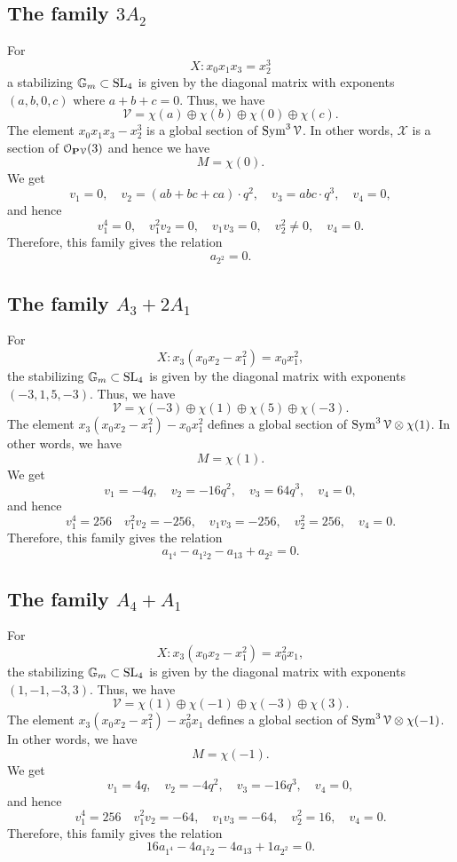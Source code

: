 \documentclass[12pt,reqno]{amsart}
\numberwithin{equation}{section}
\begin{document}
\subsection{The family $3A_2$}
For
\[ X: x_0x_1x_3 = x_2^3\]
a stabilizing $\mathbb G_m \subset \SL_4$ is given by the diagonal matrix with exponents $(a,b,0,c)$ where $a+b+c = 0$.
Thus, we have
\[\mathcal V = \chi(a) \oplus \chi(b) \oplus \chi(0) \oplus \chi(c).\]
The element $x_0x_1x_3 - x_2^3$ is a global section of $\Sym^3 \mathcal V$.
In other words, $\mathcal X$ is a section of $\mathcal O_{\P \mathcal V}(3)$ and hence we have
\[ M = \chi(0).\]
We get
\[ v_1 = 0, \quad v_2 = (ab+bc+ca) \cdot q^2, \quad v_3 = abc \cdot q^3, \quad v_4 = 0,\]
and hence
\[ v_1^4 = 0, \quad v_1^2v_2 = 0, \quad v_1v_3 = 0,\quad v_2^2 \neq 0, \quad v_4 = 0.\]
Therefore, this family gives the relation
\begin{equation}\label{eqn:iso1}
  a_{2^2} = 0.
\end{equation}

\subsection{The family $A_3 + 2A_1$}
For
\[ X: x_3(x_0x_2-x_1^2) = x_0x_1^2,\]
the stabilizing $\mathbb G_m \subset \SL_4$ is given by the diagonal matrix with exponents $(-3,1,5,-3)$.
Thus, we have
\[ \mathcal V = \chi(-3) \oplus \chi(1) \oplus \chi(5) \oplus \chi(-3).\]
The element $x_3(x_0x_2-x_1^2) - x_0x_1^2$ defines a global section of $\Sym^3 \mathcal V \otimes \chi(1)$.
In other words, we have
\[ M = \chi(1).\]
We get
\[ v_1 = -4q, \quad v_2 = -16q^2, \quad v_3 = 64q^3, \quad v_4 = 0,\]
and hence
\[ v_1^4 = 256 \quad v_1^2v_2 = -256, \quad v_1v_3 = -256, \quad v_2^2 = 256, \quad v_4 = 0.\]
Therefore, this family gives the relation
\begin{equation}\label{eqn:iso2}
  a_{1^4} - a_{1^2 2}- a_{13} +  a_{2^2}  = 0.
\end{equation}

\subsection{The family $A_4 + A_1$}
For
\[ X: x_3(x_0x_2-x_1^2) = x_0^2x_1,\]
the stabilizing $\mathbb G_m \subset \SL_4$ is given by the diagonal matrix with exponents $(1,-1,-3,3)$.
Thus, we have
\[ \mathcal V = \chi(1) \oplus \chi(-1) \oplus \chi(-3) \oplus \chi(3).\]
The element $x_3(x_0x_2-x_1^2) - x^2_0x_1$ defines a global section of $\Sym^3 \mathcal V \otimes \chi(-1)$.
In other words, we have
\[ M = \chi(-1).\]
We get
\[ v_1 = 4q, \quad v_2 = -4q^2, \quad v_3 = -16q^3, \quad v_4 = 0,\]
and hence
\[ v_1^4 = 256 \quad v_1^2v_2 = -64, \quad v_1v_3 = -64, \quad v_2^2 = 16, \quad v_4 = 0.\]
Therefore, this family gives the relation
\begin{equation}\label{eqn:iso3}
  16a_{1^4} -4a_{1^2 2}- 4a_{13} + 1 a_{2^2}  = 0.
\end{equation}
\end{document}
